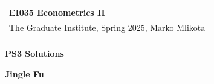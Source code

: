 \documentclass[a4paper,12pt]{article} %
\theoremstyle{nonitalic}
\begin{document}
\thispagestyle{empty} %

\begin{tabular}{p{15.5cm}} %
{\large \bf EI035 Econometrics II} \\
The Graduate Institute, Spring 2025, Marko Mlikota\\
\hline %
\\
\end{tabular} %

\vspace*{0.3cm} %

\begin{center} %
	{\Large \bf PS3 Solutions} %
	\vspace{2mm}
	
	{\bf Jingle Fu} %
		
\end{center}  

\vspace{0.4cm}
\end{document}
